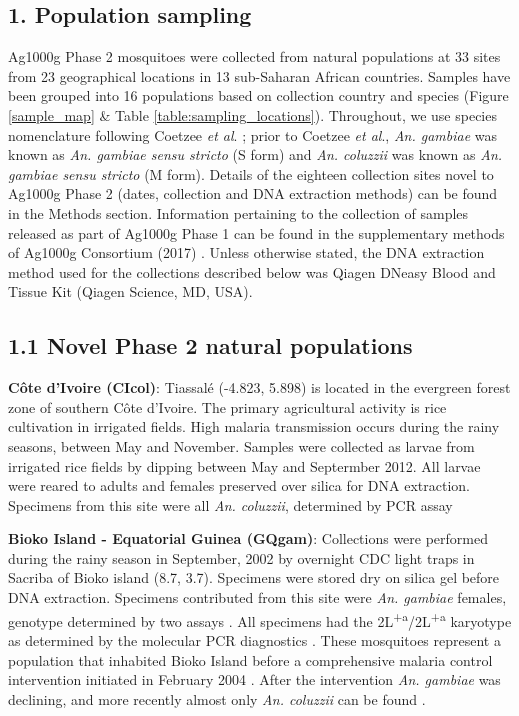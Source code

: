 \documentclass[a4paper,11pt,abstracton,hidelinks]{scrartcl}
\begin{document}
\subsection*{1. Population sampling}

%
Ag1000g Phase 2 mosquitoes were collected from natural populations at 33 sites from 23
geographical locations in 13 sub-Saharan African countries. 
%
Samples have been grouped into 16 populations based on collection country and species (Figure \ref{sample_map} \& Table \ref{table:sampling_locations}).
%
Throughout, we use species nomenclature following Coetzee \textit{et al}. \cite{Coetzee2013};	
%
prior to	 Coetzee	 \textit{et al}., \textit{An. gambiae} was known as \textit{An. gambiae sensu stricto} (S form) and \textit{An. coluzzii} was known as \textit{An. gambiae sensu stricto} (M form).
%
Details of the eighteen collection sites novel to Ag1000g Phase 2 (dates, collection and DNA extraction methods) can be found in the Methods section.
%
Information pertaining to the collection of samples released as part of Ag1000g Phase 1 can be found in the supplementary methods of Ag1000g Consortium (2017) \cite{Ag1000gConsortium2017}.
%
Unless otherwise stated, the DNA extraction method used for the collections described below was Qiagen DNeasy Blood and Tissue Kit (Qiagen Science, MD, USA).

\subsection*{1.1 Novel Phase 2 natural populations}
%
\textbf{C\^{o}te d'Ivoire (CIcol)}: Tiassal\'{e} (-4.823, 5.898) is located in the evergreen forest zone of southern C\^{o}te d'Ivoire.
%
The primary agricultural activity is rice cultivation in irrigated fields.
%
High malaria transmission occurs during the rainy seasons, between May and November.
%
Samples were collected as larvae from irrigated rice fields by dipping between May and Septermber 2012.
%
All larvae were reared to adults and females preserved over silica for DNA extraction.
%
Specimens from this site were all \textit{An. coluzzii}, determined by PCR assay \cite{Santolamazza2008}

\textbf{Bioko Island - Equatorial Guinea (GQgam)}: Collections were performed during the rainy season in September, 2002 by overnight CDC light traps in Sacriba of Bioko island (8.7, 3.7).
%
Specimens were stored dry on silica gel before DNA extraction.
%
Specimens contributed from this site were \textit{An. gambiae} females, genotype determined by two assays \cite{Scott1993, Santolamazza2004}.
%
All specimens had the 2L\textsuperscript{+a}/2L\textsuperscript{+a} karyotype as determined by the molecular PCR diagnostics \cite{White2007}. 
%
These mosquitoes represent a population that inhabited Bioko Island before a comprehensive malaria control intervention initiated in February 2004 \cite{Sharp2007}. 
%
After the intervention \textit{An. gambiae} was declining, and more recently almost only \textit{An. coluzzii} can be found \cite{Overgaard2012}.
\end{document}
